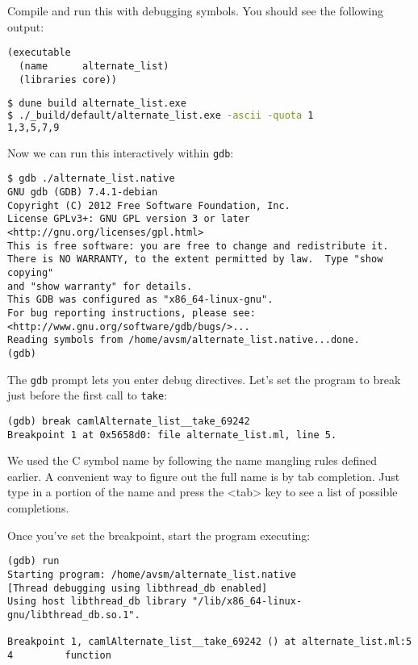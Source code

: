 Compile and run this with debugging symbols. You should see the
following output:

\begin{lstlisting}
(executable
  (name      alternate_list)
  (libraries core))
\end{lstlisting}

\begin{lstlisting}[language=bash]
$ dune build alternate_list.exe
$ ./_build/default/alternate_list.exe -ascii -quota 1
1,3,5,7,9
\end{lstlisting}

Now we can run this interactively within \passthrough{\lstinline!gdb!}:

\begin{lstlisting}
$ gdb ./alternate_list.native
GNU gdb (GDB) 7.4.1-debian
Copyright (C) 2012 Free Software Foundation, Inc.
License GPLv3+: GNU GPL version 3 or later <http://gnu.org/licenses/gpl.html>
This is free software: you are free to change and redistribute it.
There is NO WARRANTY, to the extent permitted by law.  Type "show copying"
and "show warranty" for details.
This GDB was configured as "x86_64-linux-gnu".
For bug reporting instructions, please see:
<http://www.gnu.org/software/gdb/bugs/>...
Reading symbols from /home/avsm/alternate_list.native...done.
(gdb)
\end{lstlisting}

The \passthrough{\lstinline!gdb!} prompt lets you enter debug
directives. Let's set the program to break just before the first call to
\passthrough{\lstinline!take!}:

\begin{lstlisting}
(gdb) break camlAlternate_list__take_69242
Breakpoint 1 at 0x5658d0: file alternate_list.ml, line 5.
\end{lstlisting}

We used the C symbol name by following the name mangling rules defined
earlier. A convenient way to figure out the full name is by tab
completion. Just type in a portion of the name and press the
\textless tab\textgreater{} key to see a list of possible completions.

Once you've set the breakpoint, start the program executing:

\begin{lstlisting}
(gdb) run
Starting program: /home/avsm/alternate_list.native
[Thread debugging using libthread_db enabled]
Using host libthread_db library "/lib/x86_64-linux-gnu/libthread_db.so.1".

Breakpoint 1, camlAlternate_list__take_69242 () at alternate_list.ml:5
4         function
\end{lstlisting}

